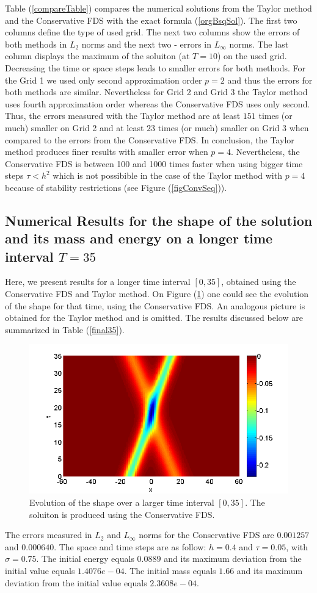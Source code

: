 \documentclass[%
 aip,
cp,  
 amsmath,amssymb,
 reprint,
]{iopconfser}
\newcommand{\rf}[1]{(\ref{#1})}
\begin{document}
Table \rf{compareTable} compares the numerical solutions from the Taylor method and the Conservative FDS with the exact formula \rf{orgBsqSol}. The first two columns define the type of used grid. The next two columns show the errors of both methods in $L_2$ norms and the next two - errors in $L_\infty$ norms. The last column displays the maximum of the soluiton (at $T=10$) on the used grid. Decreasing the time or space steps leads to smaller errors
for both methods. For the Grid 1 we used only second approximation order $p=2$ and thus the errors for both methods are similar. Nevertheless for Grid 2 and Grid 3 the Taylor method uses fourth approximation order whereas 
the Conservative FDS uses only second. Thus, the errors measured with the Taylor method are at least $151$ times (or much) smaller on Grid 2 and at least $23$ times (or much) smaller on Grid 3 when compared to the errors from the Conservative FDS. In conclusion, the Taylor method produces finer results with smaller error when $p=4$. Nevertheless, the Conservative FDS is between 100 and 1000 times faster when using bigger time steps $\tau < h^2$ which is not possibible in the case of the Taylor method with $p=4$ because of stability restrictions (see Figure \rf{figConvSeq}).
\fi
\subsection{Numerical Results for the shape of the solution and its mass and energy on a longer time interval $T = 35$}

Here, we present results for a longer time interval $[0, 35]$, obtained using the Conservative FDS and Taylor method. On Figure \rf{sol35} one could see the evolution of the shape for that time, using the Conservative FDS. An analogous picture is obtained for the Taylor method and is omitted. The results discussed below are summarized in Table \rf{final35}. 

\begin{figure}[H]\vspace{0.2cm}
	\centering
	\includegraphics[width=0.7\linewidth]{solution2.png}
\caption{Evolution of the shape over a larger time interval $[0, 35]$. The soluiton is produced using the Conservative FDS.}
\label{sol35}
\end{figure}
The errors measured in $L_2$ and $L_\infty$ norms for the Conservative FDS are $0.001257$ and $0.000640$. The space and time steps are as follow: $h = 0.4$ and  $\tau = 0.05$, with $\sigma = 0.75$. The initial energy equals $0.0889$ and its maximum deviation from the initial value equals $1.4076e-04$. The initial mass equals $1.66$ and its maximum deviation from the initial value equals $2.3608e-04$.
\end{document}
